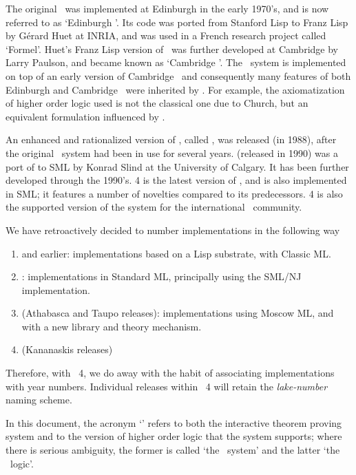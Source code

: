 The original \LCF\ was implemented at Edinburgh in the early 1970's, and is now
referred to as `Edinburgh \LCF'. Its code was ported from Stanford Lisp to
Franz Lisp by G\'erard Huet at {\small INRIA}, and was used in a French
research project called `Formel'.  Huet's Franz Lisp version of \LCF\ was
further developed at Cambridge by Larry Paulson, and became known as `Cambridge
\LCF'. The \HOL\ system is implemented on top of an early version of Cambridge
\LCF\ and consequently many features of both Edinburgh and Cambridge \LCF\ were
inherited by \HOL. For example, the axiomatization of higher order logic used
is not the classical one due to Church, but an equivalent formulation
influenced by \LCF.

An enhanced and rationalized version of \HOL, called , was
released (in 1988), after the original \HOL\ system had been in use
for several years.   (released in 1990) was a port of 
to SML \cite{sml} by Konrad Slind at the University of Calgary. It has
been further developed through the 1990's. \HOL{} 4 is the latest
version of \HOL, and is also implemented in SML; it features a number
of novelties compared to its predecessors.  \HOL{} 4 is also the
supported version of the system for the international \HOL\ community.

We have retroactively decided to number \HOL{} implementations in the
following way
\begin{enumerate}
\item {} and earlier: implementations based on a Lisp substrate,
  with Classic ML.
\item {}: implementations in Standard ML, principally using the
  SML/NJ implementation.
\item {} (Athabasca and Taupo releases): implementations using
  Moscow ML, and with a new library and theory mechanism.
\item \HOL{} (Kananaskis releases)
\end{enumerate}
Therefore, with \HOL{}~4, we do away with the habit of associating
implementations with year numbers.  Individual releases within
\HOL{}~4 will retain the \textit{lake-number} naming scheme.

In this document, the acronym `\HOL' refers to both the interactive theorem
proving system and to the version of higher order logic that the system
supports; where there is serious ambiguity, the former is called `the \HOL\
system' and the latter `the \HOL\ logic'.



